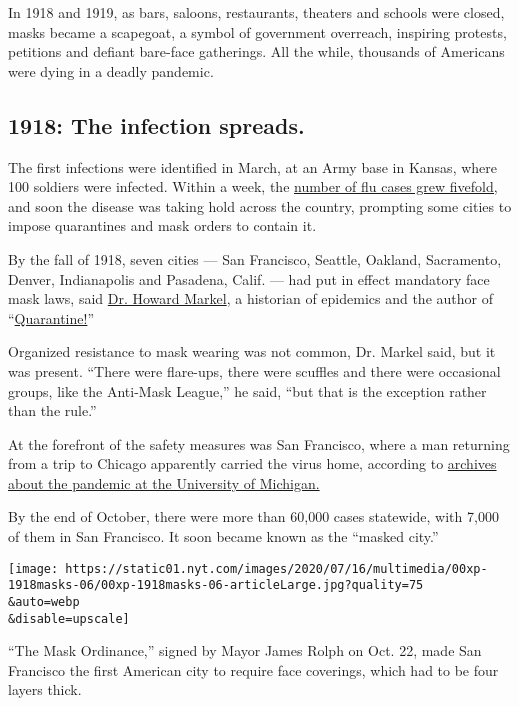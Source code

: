In 1918 and 1919, as bars, saloons, restaurants, theaters and schools
were closed, masks became a scapegoat, a symbol of government overreach,
inspiring protests, petitions and defiant bare-face gatherings. All the
while, thousands of Americans were dying in a deadly pandemic.

\hypertarget{1918-the-infection-spreads}{%
\subsection{1918: The infection
spreads.}\label{1918-the-infection-spreads}}

The first infections were identified in March, at an Army base in
Kansas, where 100 soldiers were infected. Within a week, the
\href{https://www.cdc.gov/flu/pandemic-resources/1918-commemoration/pandemic-timeline-1918.htm}{number
of flu cases grew fivefold,} and soon the disease was taking hold across
the country, prompting some cities to impose quarantines and mask orders
to contain it.

By the fall of 1918, seven cities --- San Francisco, Seattle, Oakland,
Sacramento, Denver, Indianapolis and Pasadena, Calif. --- had put in
effect mandatory face mask laws, said
\href{http://chm.med.umich.edu/about/howard-markel-m-d-ph-d/}{Dr. Howard
Markel}, a historian of epidemics and the author of
``\href{https://jhupbooks.press.jhu.edu/title/quarantine}{Quarantine!}''

Organized resistance to mask wearing was not common, Dr. Markel said,
but it was present. ``There were flare-ups, there were scuffles and
there were occasional groups, like the Anti-Mask League,'' he said,
``but that is the exception rather than the rule.''

At the forefront of the safety measures was San Francisco, where a man
returning from a trip to Chicago apparently carried the virus home,
according to
\href{http://www.influenzaarchive.org/cities/city-sanfrancisco.html}{archives
about the pandemic at the University of Michigan.}

By the end of October, there were more than 60,000 cases statewide, with
7,000 of them in San Francisco. It soon became known as the ``masked
city.''

\texttt{[image: https://static01.nyt.com/images/2020/07/16/multimedia/00xp-1918masks-06/00xp-1918masks-06-articleLarge.jpg?quality=75\\\&auto=webp\\\&disable=upscale]}

``The Mask Ordinance,'' signed by Mayor James Rolph on Oct. 22, made San
Francisco the first American city to require face coverings, which had
to be four layers thick.

